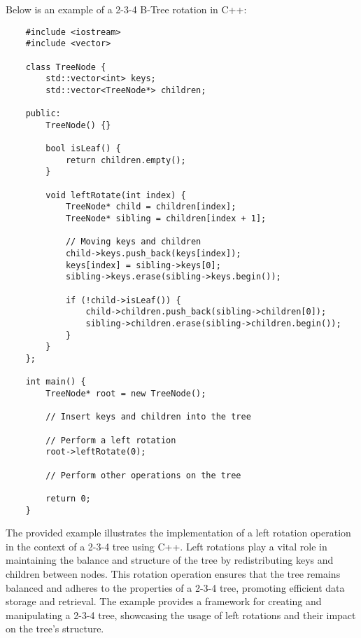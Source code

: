 \begin{solution}
    Below is an example of a 2-3-4 B-Tree rotation in C++:

    \horizontalline

    \begin{verbatim}
    #include <iostream>
    #include <vector>
    
    class TreeNode {
        std::vector<int> keys;
        std::vector<TreeNode*> children;
    
    public:
        TreeNode() {}
    
        bool isLeaf() {
            return children.empty();
        }
    
        void leftRotate(int index) {
            TreeNode* child = children[index];
            TreeNode* sibling = children[index + 1];
    
            // Moving keys and children
            child->keys.push_back(keys[index]);
            keys[index] = sibling->keys[0];
            sibling->keys.erase(sibling->keys.begin());
    
            if (!child->isLeaf()) {
                child->children.push_back(sibling->children[0]);
                sibling->children.erase(sibling->children.begin());
            }
        }
    };
    
    int main() {
        TreeNode* root = new TreeNode();
    
        // Insert keys and children into the tree
    
        // Perform a left rotation
        root->leftRotate(0);
    
        // Perform other operations on the tree
    
        return 0;
    }        
    \end{verbatim}

    \horizontalline

    The provided example illustrates the implementation of a left rotation operation in the context of a 2-3-4 tree using C++. Left rotations play a vital role in maintaining the balance and structure of the tree by redistributing keys and children between nodes. This rotation operation ensures that the tree remains balanced and 
    adheres to the properties of a 2-3-4 tree, promoting efficient data storage and retrieval. The example provides a framework for creating and manipulating a 2-3-4 tree, showcasing the usage of left rotations and their impact on the tree's structure.
\end{solution}

